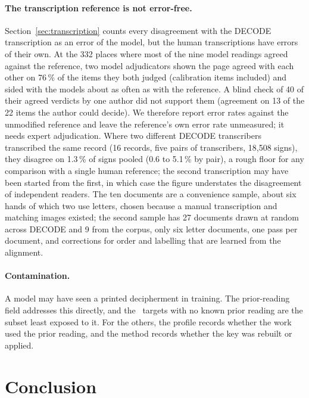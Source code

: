\documentclass[11pt]{article}
\begin{document}
\paragraph{The transcription reference is not error-free.} Section~\ref{sec:transcription} counts every disagreement with the DECODE transcription as an error of the model, but the human transcriptions have errors of their own. At the 332 places where most of the nine model readings agreed against the reference, two model adjudicators shown the page agreed with each other on 76\,\% of the items they both judged (calibration items included) and sided with the models about as often as with the reference. A blind check of 40 of their agreed verdicts by one author did not support them (agreement on 13 of the 22 items the author could decide). We therefore report error rates against the unmodified reference and leave the reference's own error rate unmeasured; it needs expert adjudication. Where two different DECODE transcribers transcribed the same record (16 records, five pairs of transcribers, 18,508 signs), they disagree on 1.3\,\% of signs pooled (0.6 to 5.1\,\% by pair), a rough floor for any comparison with a single human reference; the second transcription may have been started from the first, in which case the figure understates the disagreement of independent readers. The ten documents are a convenience sample, about six hands of which two use letters, chosen because a manual transcription and matching images existed; the second sample has 27 documents drawn at random across DECODE and 9 from the corpus, only six letter documents, one pass per document, and corrections for order and labelling that are learned from the alignment.

\paragraph{Contamination.} A model may have seen a printed decipherment in training. The prior-reading field addresses this directly, and the \Nclean\ targets with no known prior reading are the subset least exposed to it. For the others, the profile records whether the work used the prior reading, and the method records whether the key was rebuilt or applied.

\section{Conclusion}
\end{document}
